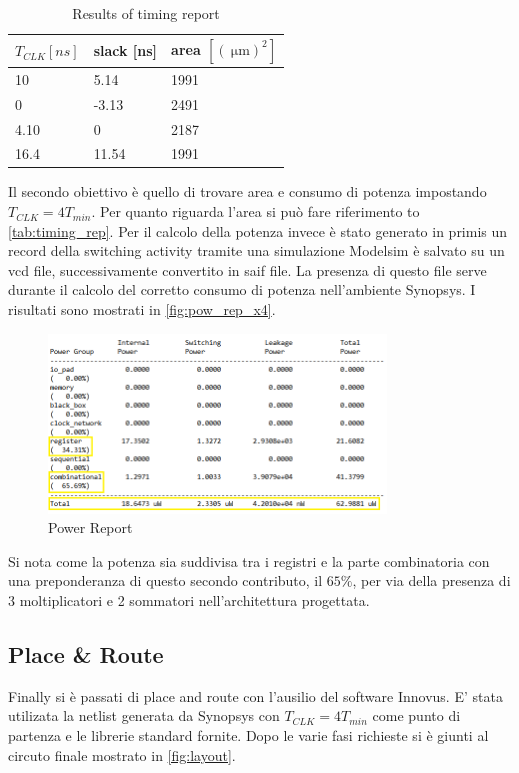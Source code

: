 \begin{table}[h]
\begin{center}
\begin{tabular}{|l|l|l|}
\hline
$T_{CLK} [ns]$ & slack [ns] & area $[(\SI{}{\micro\meter})^2]$ \\
\hline
10 & 5.14 & 1991 \\
0 & -3.13 & 2491 \\
4.10 & 0 & 2187 \\
16.4 & 11.54 & 1991 \\
\hline
\end{tabular}
\end{center}
\caption{Results of timing report}
\label{tab:timing_rep}
\end{table}

Il secondo obiettivo è quello di trovare area e consumo di potenza impostando $T_{CLK} = 4 T_{min}$. Per quanto riguarda l'area si può fare riferimento to \autoref{tab:timing_rep}. Per il calcolo della potenza invece è stato generato in primis un record della switching activity tramite una simulazione Modelsim è salvato su un vcd file, successivamente convertito in saif file. La presenza di questo file serve durante il calcolo del corretto consumo di potenza nell'ambiente Synopsys. I risultati sono mostrati in \autoref{fig:pow_rep_x4}.

\begin{figure}[h]
	\center
	\includegraphics[width=0.8\textwidth]{images/rep_power_x4_mod.png}
	\caption{Power Report}
	\label{fig:pow_rep_x4}
\end{figure}

Si nota come la potenza sia suddivisa tra i registri e la parte combinatoria con una preponderanza di questo secondo contributo, il $65\%$, per via della presenza di 3 moltiplicatori e 2 sommatori nell'architettura progettata.

\subsection{Place \& Route}
Finally si è passati di place and route con l'ausilio del software Innovus. E' stata utilizata la netlist generata da Synopsys con $T_{CLK} = 4 T_{min}$ come punto di partenza e le librerie standard fornite. Dopo le varie fasi richieste si è giunti al circuto finale mostrato in \autoref{fig:layout}.


